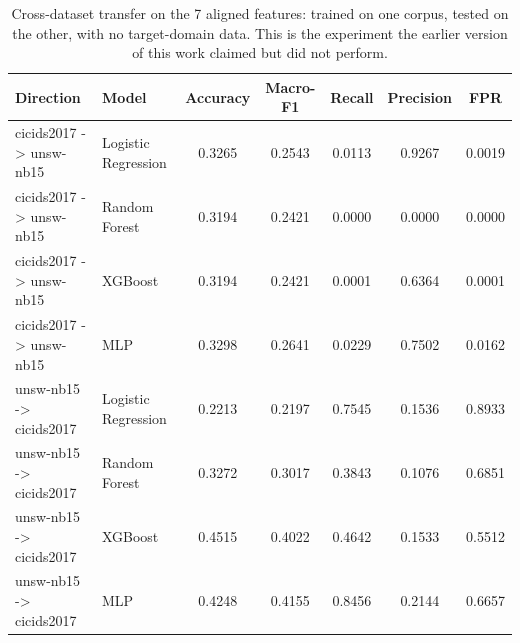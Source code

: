 \begin{table}[htbp]
\centering
\caption{Cross-dataset transfer on the 7 aligned features: trained on one corpus, tested on the other, with no target-domain data. This is the experiment the earlier version of this work claimed but did not perform.}
\label{tab:transfer}
\scriptsize
\begin{tabular}{llccccc}
\hline
Direction & Model & Accuracy & Macro-F1 & Recall & Precision & FPR \\
\hline
cicids2017 -> unsw-nb15 & Logistic Regression & 0.3265 & 0.2543 & 0.0113 & 0.9267 & 0.0019 \\
cicids2017 -> unsw-nb15 & Random Forest & 0.3194 & 0.2421 & 0.0000 & 0.0000 & 0.0000 \\
cicids2017 -> unsw-nb15 & XGBoost & 0.3194 & 0.2421 & 0.0001 & 0.6364 & 0.0001 \\
cicids2017 -> unsw-nb15 & MLP & 0.3298 & 0.2641 & 0.0229 & 0.7502 & 0.0162 \\
unsw-nb15 -> cicids2017 & Logistic Regression & 0.2213 & 0.2197 & 0.7545 & 0.1536 & 0.8933 \\
unsw-nb15 -> cicids2017 & Random Forest & 0.3272 & 0.3017 & 0.3843 & 0.1076 & 0.6851 \\
unsw-nb15 -> cicids2017 & XGBoost & 0.4515 & 0.4022 & 0.4642 & 0.1533 & 0.5512 \\
unsw-nb15 -> cicids2017 & MLP & 0.4248 & 0.4155 & 0.8456 & 0.2144 & 0.6657 \\
\hline
\end{tabular}
\end{table}
